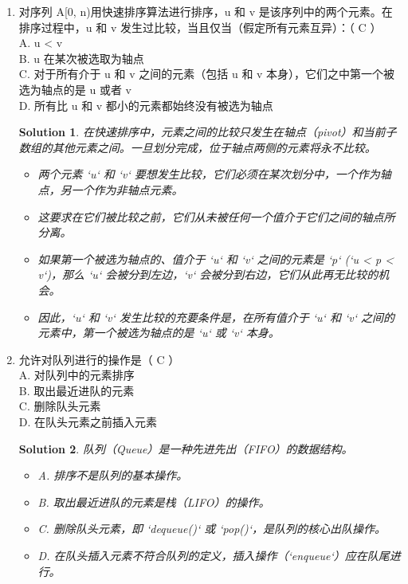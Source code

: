 \documentclass[UTF8]{report}
\newtheorem{solution}{Solution}
\theoremstyle{MyLineTheoremStyle} %
\theoremstyle{MyBlockTheoremStyle} %
\theoremstyle{MySubsubsectionStyle} %
\begin{document}
\begin{enumerate}
    \item 对序列 A[0, n)用快速排序算法进行排序，u 和 v 是该序列中的两个元素。在排序过程中，u 和 v 发生过比较，当且仅当（假定所有元素互异）：（ C ）\\
    A. u < v \\
    B. u 在某次被选取为轴点 \\
    C. 对于所有介于 u 和 v 之间的元素（包括 u 和 v 本身），它们之中第一个被选为轴点的是 u 或者 v \\
    D. 所有比 u 和 v 都小的元素都始终没有被选为轴点
    \begin{solution}
        在快速排序中，元素之间的比较只发生在轴点（pivot）和当前子数组的其他元素之间。一旦划分完成，位于轴点两侧的元素将永不比较。
        \begin{itemize}
            \item 两个元素 `u` 和 `v` 要想发生比较，它们必须在某次划分中，一个作为轴点，另一个作为非轴点元素。
            \item 这要求在它们被比较之前，它们从未被任何一个值介于它们之间的轴点所分离。
            \item 如果第一个被选为轴点的、值介于 `u` 和 `v` 之间的元素是 `p` (`u < p < v`)，那么 `u` 会被分到左边，`v` 会被分到右边，它们从此再无比较的机会。
            \item 因此，`u` 和 `v` 发生比较的充要条件是，在所有值介于 `u` 和 `v` 之间的元素中，第一个被选为轴点的是 `u` 或 `v` 本身。
        \end{itemize}
    \end{solution}

    \item 允许对队列进行的操作是（ C ）\\
    A. 对队列中的元素排序 \\
    B. 取出最近进队的元素 \\
    C. 删除队头元素 \\
    D. 在队头元素之前插入元素
    \begin{solution}
        队列（Queue）是一种先进先出（FIFO）的数据结构。
        \begin{itemize}
            \item A. 排序不是队列的基本操作。
            \item B. 取出最近进队的元素是栈（LIFO）的操作。
            \item C. 删除队头元素，即 `dequeue()` 或 `pop()`，是队列的核心出队操作。
            \item D. 在队头插入元素不符合队列的定义，插入操作（`enqueue`）应在队尾进行。
        \end{itemize}
    \end{solution}


\end{enumerate}
\end{document}
